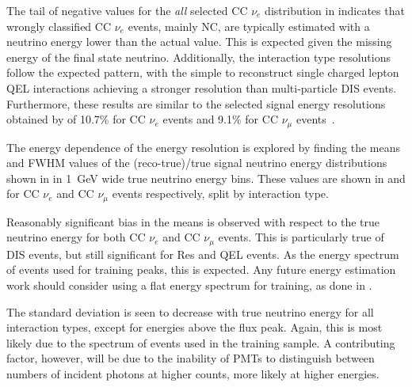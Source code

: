 The tail of negative values for the \emph{all} selected CC $\nu_{e}$ distribution in
 indicates that wrongly classified CC $\nu_{e}$ events, mainly
NC, are typically estimated with a neutrino energy lower than the actual value. This is expected
given the missing energy of the final state neutrino. Additionally, the interaction type
resolutions follow the expected pattern, with the simple to reconstruct single charged lepton QEL
interactions achieving a stronger resolution than multi-particle DIS events. Furthermore, these
results are similar to the selected signal energy resolutions obtained by \nova of 10.7\% for CC
$\nu_{e}$ events and 9.1\% for CC $\nu_{\mu}$ events~\cite{acero2019}.

The energy dependence of the energy resolution is explored by finding the means and FWHM values of
the (reco-true)/true signal neutrino energy distributions shown in
 in \SI{1}{GeV} wide true neutrino energy bins. These values are
shown in  and  for CC $\nu_{e}$
and CC $\nu_{\mu}$ events respectively, split by interaction type.

Reasonably significant bias in the means is observed with respect to the true neutrino energy for
both CC $\nu_{e}$ and CC $\nu_{\mu}$ events. This is particularly true of DIS events, but still
significant for Res and QEL events. As the energy spectrum of events used for training peaks, this
is expected. Any future energy estimation work should consider using a flat energy spectrum for
training, as done in .

The standard deviation is seen to decrease with true neutrino energy for all interaction types,
except for energies above the flux peak. Again, this is most likely due to the spectrum of events
used in the training sample. A contributing factor, however, will be due to the inability of PMTs
to distinguish between numbers of incident photons at higher counts, more likely at higher
energies.

